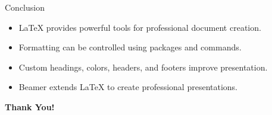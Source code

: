 \documentclass{beamer}
\begin{document}
\begin{frame}{Conclusion}

\begin{itemize}
\item LaTeX provides powerful tools for professional document creation.
\item Formatting can be controlled using packages and commands.
\item Custom headings, colors, headers, and footers improve presentation.
\item Beamer extends LaTeX to create professional presentations.
\end{itemize}

\vfill

\begin{center}
\Large \textbf{Thank You!}
\end{center}

\end{frame}
\end{document}
